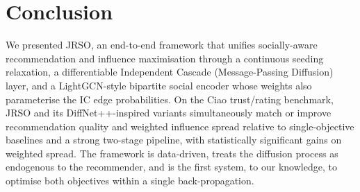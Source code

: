 \documentclass[conference]{IEEEtran}
\begin{document}
\section{Conclusion}
We presented JRSO, an end-to-end framework that unifies socially-aware
recommendation and influence maximisation through a continuous seeding
relaxation, a differentiable Independent Cascade (Message-Passing
Diffusion) layer, and a LightGCN-style bipartite social encoder whose
weights also parameterise the IC edge probabilities. On the Ciao
trust/rating benchmark, JRSO and its DiffNet++-inspired variants
simultaneously match or improve recommendation quality and weighted
influence spread relative to single-objective baselines and a strong
two-stage pipeline, with statistically significant gains on weighted
spread. The framework is data-driven, treats the diffusion process as
endogenous to the recommender, and is the first system, to our
knowledge, to optimise both objectives within a single back-propagation.



\end{document}
